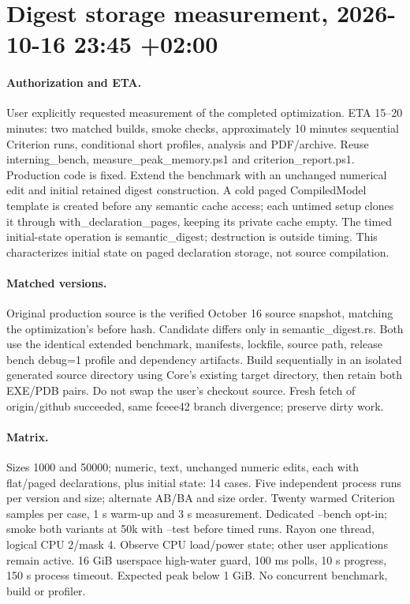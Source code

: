 \documentclass[11pt,a4paper]{article}
\begin{document}
\section*{Digest storage measurement, 2026-10-16 23:45 +02:00}
\paragraph{Authorization and ETA.} User explicitly requested measurement of the
completed optimization. ETA 15--20 minutes: two matched builds, smoke checks,
approximately 10 minutes sequential Criterion runs, conditional short profiles,
analysis and PDF/archive. Reuse interning\_bench, measure\_peak\_memory.ps1 and
criterion\_report.ps1. Production code is fixed. Extend the benchmark with an
unchanged numerical edit and initial retained digest construction. A cold paged
CompiledModel template is created before any semantic cache access; each untimed
setup clones it through with\_declaration\_pages, keeping its private cache empty.
The timed initial-state operation is semantic\_digest; destruction is outside timing.
This characterizes initial state on paged declaration storage, not source compilation.
\paragraph{Matched versions.} Original production source is the verified October 16
source snapshot, matching the optimization's before hash. Candidate differs only in
semantic\_digest.rs. Both use the identical extended benchmark, manifests, lockfile,
source path, release bench debug=1 profile and dependency artifacts. Build sequentially
in an isolated generated source directory using Core's existing target directory,
then retain both EXE/PDB pairs. Do not swap the user's checkout source. Fresh fetch
of origin/github succeeded, same fceee42 branch divergence; preserve dirty work.
\paragraph{Matrix.} Sizes 1000 and 50000; numeric, text, unchanged numeric edits,
each with flat/paged declarations, plus initial state: 14 cases. Five independent
process runs per version and size; alternate AB/BA and size order. Twenty warmed
Criterion samples per case, 1 s warm-up and 3 s measurement. Dedicated --bench opt-in;
smoke both variants at 50k with --test before timed runs. Rayon one thread, logical
CPU 2/mask 4. Observe CPU load/power state; other user applications remain active.
16 GiB userspace high-water guard, 100 ms polls, 10 s progress, 150 s process timeout.
Expected peak below 1 GiB. No concurrent benchmark, build or profiler.
\end{document}
